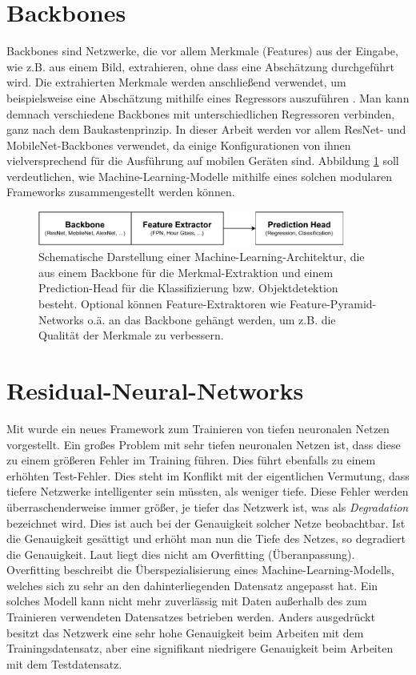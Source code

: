 \section{Backbones}
Backbones sind Netzwerke, die vor allem Merkmale (Features) aus der Eingabe, wie
z.B. aus einem Bild, extrahieren, ohne dass eine Abschätzung durchgeführt wird.
Die extrahierten Merkmale werden anschließend verwendet, um beispielsweise eine
Abschätzung mithilfe eines Regressors auszuführen \cite{amjoud2020backbones}.
Man kann demnach verschiedene Backbones mit unterschiedlichen Regressoren
verbinden, ganz nach dem Baukastenprinzip. In dieser Arbeit werden vor allem
ResNet- und MobileNet-Backbones verwendet, da einige Konfigurationen von ihnen
vielversprechend für die Ausführung auf mobilen Geräten sind. Abbildung
\ref{fig:backbone-regressor-framework} soll verdeutlichen, wie
Machine-Learning-Modelle mithilfe eines solchen modularen Frameworks
zusammengestellt werden können.

\begin{figure}
  \centering
  \includegraphics[width=0.9\textwidth]{images/backbone-regressor-framework.pdf}
  \caption{Schematische Darstellung einer Machine-Learning-Architektur, die aus
  einem Backbone für die Merkmal-Extraktion und einem Prediction-Head für die
Klassifizierung bzw. Objektdetektion besteht. Optional können
Feature-Extraktoren wie Feature-Pyramid-Networks o.ä. an das Backbone gehängt
werden, um z.B. die Qualität der Merkmale zu verbessern.}
  \label{fig:backbone-regressor-framework}
\end{figure}

\FloatBarrier

\section{Residual-Neural-Networks}\label{section:residual-blocks}
Mit \cite{he2015deep} wurde ein neues Framework zum Trainieren von tiefen
neuronalen Netzen vorgestellt. Ein großes Problem mit sehr tiefen neuronalen
Netzen ist, dass diese zu einem größeren Fehler im Training führen. Dies führt
ebenfalls zu einem erhöhten Test-Fehler. Dies steht im Konflikt mit der
eigentlichen Vermutung, dass tiefere Netzwerke intelligenter sein müssten, als
weniger tiefe. Diese Fehler werden überraschenderweise immer größer, je tiefer
das Netzwerk ist, was als \textit{Degradation} bezeichnet wird.
Dies ist auch bei der Genauigkeit solcher Netze beobachtbar. Ist die
Genauigkeit gesättigt und erhöht man nun die Tiefe des Netzes, so degradiert
die Genauigkeit. Laut \cite{he2015deep} liegt dies nicht am Overfitting
(Überanpassung). Overfitting beschreibt die Überspezialisierung eines
Machine-Learning-Modells, welches sich zu sehr an den dahinterliegenden
Datensatz angepasst hat. Ein solches Modell kann nicht mehr zuverlässig mit
Daten außerhalb des zum Trainieren verwendeten Datensatzes betrieben werden.
Anders ausgedrückt besitzt das Netzwerk eine sehr hohe Genauigkeit beim
Arbeiten mit dem Trainingsdatensatz, aber eine signifikant niedrigere
Genauigkeit beim Arbeiten mit dem Testdatensatz.

